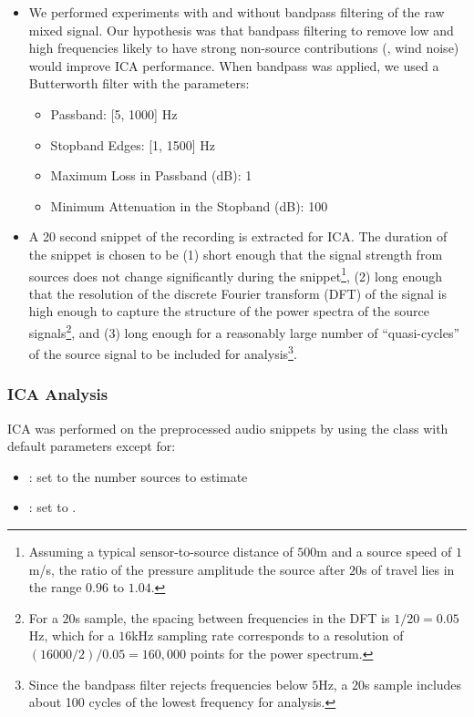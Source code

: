 \documentclass[10pt]{article}
\begin{document}
\begin{itemize}
    \item We performed experiments with and without bandpass filtering of the raw mixed
        signal. Our hypothesis was that bandpass filtering to remove low and
        high frequencies likely to have strong non-source contributions (\eg, wind noise)
        would improve ICA performance. When bandpass was applied, we used a Butterworth
        filter with the parameters:

        \begin{itemize}
            \item Passband: [5, 1000] Hz
            \item Stopband Edges: [1, 1500] Hz
            \item Maximum Loss in Passband (dB): 1
            \item Minimum Attenuation in the Stopband (dB): 100
        \end{itemize}

    \item A 20 second snippet of the recording is extracted for ICA. The duration of the
        snippet is chosen to be (1) short enough that the signal strength from sources
        does not change significantly during the snippet\footnote{Assuming a typical
        sensor-to-source distance of $500$m and a source speed of $1$m/s, the ratio of the
        pressure amplitude the source after $20$s of travel lies in the range $0.96$ to
        $1.04$.}, (2) long enough that the resolution of the discrete Fourier transform
        (DFT) of the signal is high enough to capture the structure of the power spectra of
        the source signals\footnote{For a $20$s sample, the spacing between frequencies in
        the DFT is $1 / 20 = 0.05$Hz, which for a $16$kHz sampling rate corresponds to a
        resolution of $(16000 / 2) / 0.05 = 160,000$ points for the power spectrum.}, and
        (3) long enough for a reasonably large number of ``quasi-cycles'' of the source
        signal to be included for analysis\footnote{Since the bandpass filter rejects
        frequencies below $5$Hz, a $20$s sample includes about 100 cycles of the lowest
        frequency for analysis.}.
\end{itemize}

\subsubsection*{ICA Analysis}
ICA was performed on the preprocessed audio snippets by using the 
 class with default parameters except for:
\begin{itemize}
    \item {}: set to the number sources to estimate
    \item {}: set to .
\end{itemize}
\end{document}
